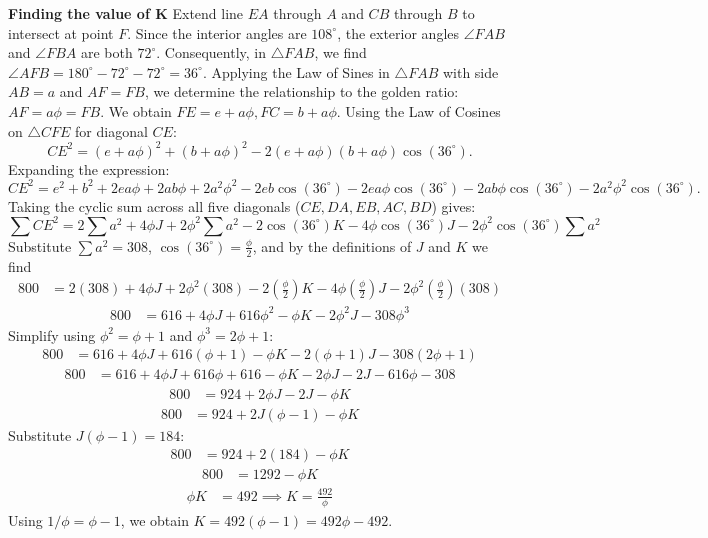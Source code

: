 \begin{enumerate}
 \textbf{Finding the value of K} Extend line $EA$ through $A$ and $CB$ through $B$ to intersect at point $F$. Since the interior angles are $108^\circ$, the exterior angles $\angle FAB$ and $\angle FBA$ are both $72^\circ$. Consequently, in $\triangle FAB$, we find $\angle AFB = 180^\circ - 72^\circ - 72^\circ = 36^\circ$. Applying the Law of Sines in $\triangle FAB$ with side $AB=a$ and $AF=FB$, we determine the relationship to the golden ratio: $AF = a\phi = FB$. We obtain $FE = e + a\phi, FC = b + a\phi$. Using the Law of Cosines on $\triangle CFE$ for diagonal $CE$: 
 \[CE^2 = (e+a\phi)^2 + (b+a\phi)^2 - 2(e+a\phi)(b+a\phi)\cos(36^\circ).\]Expanding the expression: 
 \[CE^2 = e^2 + b^2 + 2ea\phi + 2ab\phi + 2a^2\phi^2 - 2eb\cos(36^\circ) - 2ea\phi\cos(36^\circ) - 2ab\phi\cos(36^\circ) - 2a^2\phi^2\cos(36^\circ).\]Taking the cyclic sum across all five diagonals ($CE, DA, EB, AC, BD$) gives: 
 \[\sum CE^2 = 2\sum a^2 + 4\phi J + 2\phi^2 \sum a^2 - 2\cos(36^\circ) K - 4\phi\cos(36^\circ) J - 2\phi^2\cos(36^\circ) \sum a^2\]Substitute $\sum a^2 = 308$, $\cos(36^\circ) = \frac{\phi}{2}$, and by the definitions of $J$ and $K$ we find\begin{align*} 800 &= 2(308) + 4\phi J + 2\phi^2(308) - 2\left(\frac{\phi}{2}\right)K - 4\phi\left(\frac{\phi}{2}\right)J - 2\phi^2\left(\frac{\phi}{2}\right)(308) \end{align*}
 \begin{align*} 800 &= 616 + 4\phi J + 616\phi^2 - \phi K - 2\phi^2 J - 308\phi^3\end{align*}
 Simplify using $\phi^2 = \phi + 1$ and $\phi^3 = 2\phi + 1$:\begin{align*}800 &= 616 + 4\phi J + 616(\phi + 1) - \phi K - 2(\phi + 1)J - 308(2\phi + 1) \end{align*}
 \begin{align*} 800 &= 616 + 4\phi J + 616\phi + 616 - \phi K - 2\phi J - 2J - 616\phi - 308 \end{align*}
 \begin{align*} 800 &= 924 + 2\phi J - 2J - \phi K \end{align*}
 \begin{align*} 800 &= 924 + 2J(\phi - 1) - \phi K\end{align*}
Substitute $J(\phi - 1) = 184$:\begin{align*}800 &= 924 + 2(184) - \phi K \end{align*}
 \begin{align*} 800 &= 1292 - \phi K  \end{align*}
 \begin{align*} \phi K &= 492 \implies K = \frac{492}{\phi}\end{align*}
Using $1/\phi = \phi - 1$, we obtain $K = 492(\phi - 1) = 492\phi - 492$.


\end{enumerate}
